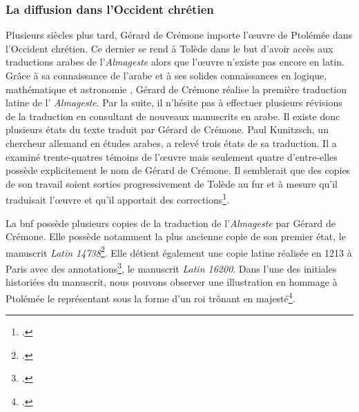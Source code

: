 
\subsubsection{La diffusion dans l'Occident chrétien}


Plusieurs siècles plus tard, Gérard de Crémone importe l'œuvre de Ptolémée dans l'Occident chrétien. 
Ce dernier se rend à Tolède dans le but d'avoir accès aux traductions arabes de l'\textit{Almageste} alors que l'œuvre n'existe pas encore en latin. Grâce à sa connaissance de l'arabe et à ses solides connaissances en logique, mathématique et astronomie , Gérard de Crémone réalise la première traduction latine de l' \textit{Almageste}. Par la suite, il n'hésite pas à effectuer plusieurs révisions de la traduction en consultant de nouveaux manuscrits en arabe. Il existe donc plusieurs états du texte traduit par Gérard de Crémone. Paul Kunitzsch, un chercheur allemand en études arabes, a relevé trois états de sa traduction. Il a examiné trente-quatres témoins de l'œuvre mais seulement quatre d'entre-elles possède explicitement le nom de Gérard de Crémone. Il semblerait que des copies de son travail soient sorties progressivement de Tolède au fur et à mesure qu'il traduisait l'œuvre et qu'il apportait des corrections\footcite{jacquartTraductionsAuFil2018}.

La \gls{bnf} possède plusieurs copies de la traduction de l'\textit{Almageste} par Gérard de Crémone. Elle possède notamment la plus ancienne copie de son premier état, le manuscrit \textit{Latin 14738}\footcite{jacquartTraductionsAuFil2018}. Elle détient également une copie latine réalisée en 1213 à Paris avec des annotations\footcite{ptolemaeusPtolomeusAlmagestumTransl1213}, le manuscrit \textit{Latin 16200}. 
Dans l'une des initiales historiées du manuscrit, nous pouvons observer une illustration en hommage  à Ptolémée le représentant sous la forme d'un roi trônant en majesté\footcite{TraductionLatineLAlmageste}. 


